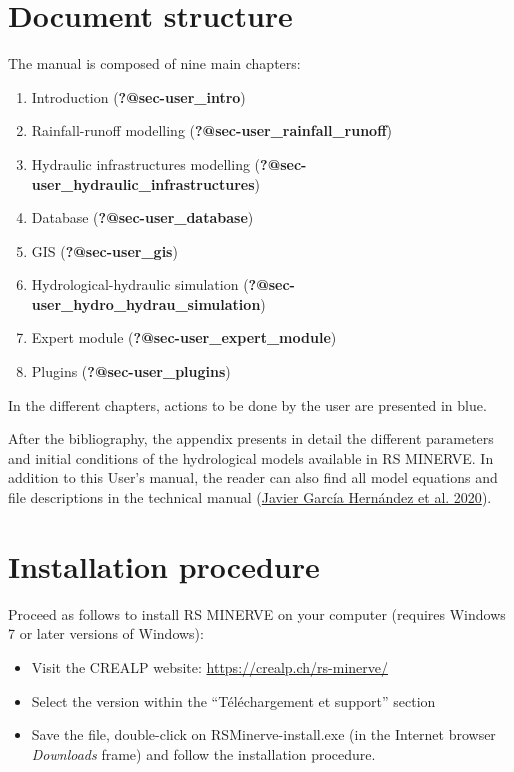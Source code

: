 \documentclass[
  letterpaper,
  DIV=11,
  numbers=noendperiod]{scrreprt}
\begin{document}
\hypertarget{document-structure}{%
\chapter{Document structure}\label{document-structure}}

The manual is composed of nine main chapters:

\begin{enumerate}
\def\labelenumi{\arabic{enumi}.}
\item
  Introduction (\textbf{?@sec-user\_intro})
\item
  Rainfall-runoff modelling (\textbf{?@sec-user\_rainfall\_runoff})
\item
  Hydraulic infrastructures modelling
  (\textbf{?@sec-user\_hydraulic\_infrastructures})
\item
  Database (\textbf{?@sec-user\_database})
\item
  GIS (\textbf{?@sec-user\_gis})
\item
  Hydrological-hydraulic simulation
  (\textbf{?@sec-user\_hydro\_hydrau\_simulation})
\item
  Expert module (\textbf{?@sec-user\_expert\_module})
\item
  Plugins (\textbf{?@sec-user\_plugins})
\end{enumerate}

{In the different chapters, actions to be done by the user are presented
in blue}.

After the bibliography, the appendix presents in detail the different
parameters and initial conditions of the hydrological models available
in RS MINERVE. In addition to this User's manual, the reader can also
find all model equations and file descriptions in the technical manual
(\protect\hyperlink{ref-garcia_hernandez_rs_2020}{Javier García
Hernández et al. 2020}).

\hypertarget{installation-procedure}{%
\chapter{Installation procedure}\label{installation-procedure}}

Proceed as follows to install RS MINERVE on your computer (requires
Windows 7 or later versions of Windows):

\begin{itemize}
\item
  Visit the CREALP website: \url{https://crealp.ch/rs-minerve/}
\item
  Select the version within the ``Téléchargement et support'' section
\item
  Save the file, double-click on RSMinerve-install.exe (in the Internet
  browser \emph{Downloads} frame) and follow the installation procedure.
\end{itemize}
\end{document}
